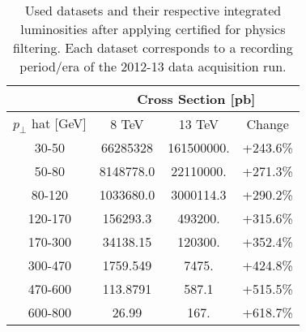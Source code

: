 \begin{table}[htp]
\centering

\begin{tabular}{|c|c|c|c|}
\hline
 & \multicolumn{3}{c|}{Cross Section [pb]} \\
\hline
$p_\perp$ hat [GeV] & 8 TeV & 13 TeV & Change \\
\hline
\hline
30-50   & 66285328      & 161500000.   & +243.6\% \\
50-80   &  8148778.0    &  22110000.   & +271.3\% \\
80-120  &  1033680.0    &   3000114.3  & +290.2\% \\
120-170 &   156293.3    &    493200.   & +315.6\% \\
170-300 &    34138.15   &    120300.   & +352.4\% \\
300-470 &     1759.549  &      7475.   & +424.8\% \\
470-600 &      113.8791 &       587.1  & +515.5\% \\
600-800 &       26.99   &       167.   & +618.7\% \\
\hline
\end{tabular}

\caption{Used datasets and their respective integrated luminosities after applying certified for physics filtering. Each dataset corresponds to a recording period/era of the 2012-13 data acquisition run.}
\end{table}

